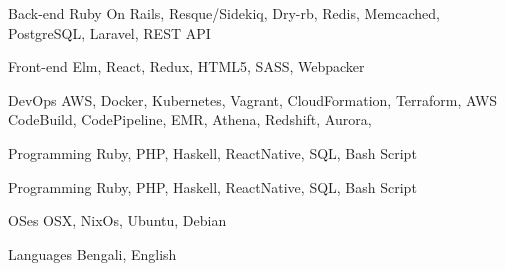 

\begin{cvskills}

  \cvskill
    {Back-end} %
    {Ruby On Rails, Resque/Sidekiq, Dry-rb, Redis, Memcached, PostgreSQL, Laravel, REST API} %

  \cvskill
    {Front-end} %
    {Elm, React, Redux, HTML5, SASS, Webpacker} %

  \cvskill
    {DevOps} %
    {AWS, Docker, Kubernetes, Vagrant, CloudFormation, Terraform, AWS CodeBuild, CodePipeline, EMR, Athena, Redshift, Aurora, } %

  \cvskill
    {Programming} %
    {Ruby, PHP, Haskell, ReactNative, SQL, Bash Script} %

  \cvskill
    {Programming} %
    {Ruby, PHP, Haskell, ReactNative, SQL, Bash Script} %

  \cvskill
    {OSes} %
    {OSX, NixOs, Ubuntu, Debian} %

  \cvskill
    {Languages} %
    {Bengali, English} %

\end{cvskills}
